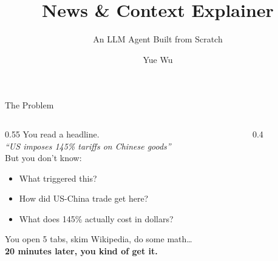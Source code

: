 \documentclass[aspectratio=169]{beamer}
\title{\textbf{News \& Context Explainer}}
\subtitle{An LLM Agent Built from Scratch}
\author{Yue Wu}
\date{}
\begin{document}
\maketitle

\begin{frame}{The Problem}
  \begin{columns}[T]
    \begin{column}{0.55\textwidth}
      \vspace{0.4cm}
      You read a headline.\\[0.6em]
      \textit{``US imposes 145\% tariffs on Chinese goods''}\\[0.8em]
      But you don't know:
      \begin{itemize}
        \item What triggered this?
        \item How did US-China trade get here?
        \item What does 145\% actually cost in dollars?
      \end{itemize}
      \vspace{0.6em}
      You open 5 tabs, skim Wikipedia, do some math\ldots\\
      \textbf{20 minutes later, you kind of get it.}
    \end{column}
    \begin{column}{0.4\textwidth}
    \end{column}
  \end{columns}
\end{frame}
\end{document}
